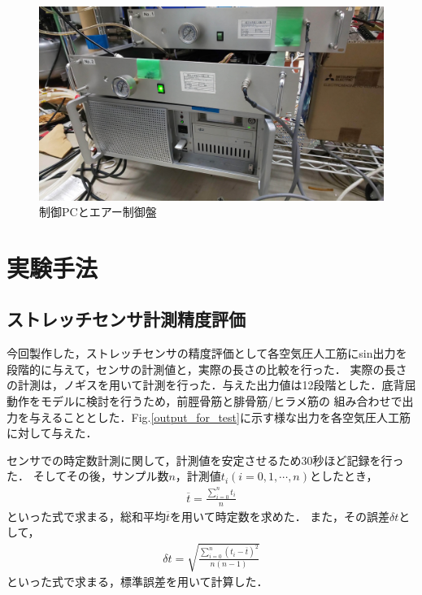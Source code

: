 \begin{figure}[h]
    \begin{center}
     \includegraphics[width=0.65\columnwidth,clip]{./3_analysis/PC.eps}
     \caption{制御PCとエアー制御盤}
     \label{fig:PC}
    \end{center}
\end{figure}

\newpage

\section{実験手法}
\subsection{ストレッチセンサ計測精度評価}
今回製作した，ストレッチセンサの精度評価として各空気圧人工筋にsin出力を段階的に与えて，センサの計測値と，実際の長さの比較を行った．
実際の長さの計測は，ノギスを用いて計測を行った．与えた出力値は12段階とした．底背屈動作をモデルに検討を行うため，前脛骨筋と腓骨筋/ヒラメ筋の
組み合わせで出力を与えることとした．Fig.\ref{output_for_test}に示す様な出力を各空気圧人工筋に対して与えた．

センサでの時定数計測に関して，計測値を安定させるため30秒ほど記録を行った．
そしてその後，サンプル数$n$，計測値$t_i \left(i=0,1,\cdots,n\right)$としたとき，
\begin{eqnarray}
        \overline{t}=\frac{\sum_{i=0}^n t_i}{n}
        \label{ave}
\end{eqnarray}
といった式で求まる，総和平均$\overline{t}$を用いて時定数を求めた．
また，その誤差$\delta t$として，
\begin{eqnarray}
    \delta t = \sqrt{ \frac{\sum_{i=0}^n \left(t_i-\overline{t}\right)^2}{n(n-1)}}
    \label{std}
\end{eqnarray}
といった式で求まる，標準誤差を用いて計算した．

